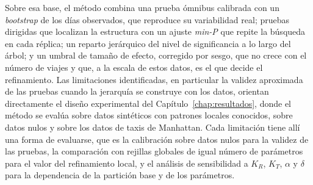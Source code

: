 Sobre esa base, el método combina una prueba ómnibus calibrada con un \emph{bootstrap}
de los días observados, que reproduce su variabilidad real; pruebas dirigidas
que localizan la estructura con un ajuste \emph{min-P} que repite la búsqueda en cada
réplica; un reparto jerárquico del nivel de significancia a lo largo del árbol;
y un umbral de tamaño de efecto, corregido por sesgo, que no crece con el número
de viajes y que, a la escala de estos datos, es el que decide el refinamiento.
Las limitaciones identificadas, en particular la validez aproximada de las
pruebas cuando la jerarquía se construye con los datos, orientan directamente
el diseño experimental del Capítulo~\ref{chap:resultados}, donde el método se
evalúa sobre datos sintéticos con patrones locales conocidos, sobre datos nulos
y sobre los datos de taxis de Manhattan. Cada limitación tiene allí una forma de
evaluarse, que es la calibración sobre datos nulos para la validez de las pruebas,
la comparación con rejillas globales de igual número de parámetros para el valor del
refinamiento local, y el análisis de sensibilidad a $K_R$, $K_T$, $\alpha$ y
$\delta$ para la dependencia de la partición base y de los parámetros.
